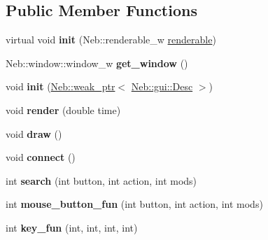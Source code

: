\subsection*{\-Public \-Member \-Functions}
\begin{DoxyCompactItemize}
\item 
\hypertarget{classNeb_1_1gui_1_1layout_a62b6d681dfea9f0dc35e6284f0daacd9}{virtual void {\bfseries init} (\-Neb\-::renderable\-\_\-w \hyperlink{classNeb_1_1renderable}{renderable})}\label{classNeb_1_1gui_1_1layout_a62b6d681dfea9f0dc35e6284f0daacd9}

\item 
\hypertarget{classNeb_1_1gui_1_1layout_a524c01b6af0320f6c89eec7b2d8a7409}{\-Neb\-::window\-::window\-\_\-w {\bfseries get\-\_\-window} ()}\label{classNeb_1_1gui_1_1layout_a524c01b6af0320f6c89eec7b2d8a7409}

\item 
\hypertarget{classNeb_1_1gui_1_1layout_af415dbb46b787503ce59ea2633a120d5}{void {\bfseries init} (\hyperlink{classNeb_1_1weak__ptr}{\-Neb\-::weak\-\_\-ptr}$<$ \hyperlink{classNeb_1_1gui_1_1Desc}{\-Neb\-::gui\-::\-Desc} $>$)}\label{classNeb_1_1gui_1_1layout_af415dbb46b787503ce59ea2633a120d5}

\item 
\hypertarget{classNeb_1_1gui_1_1layout_a74db00418c895eb927fb677d62840da2}{void {\bfseries render} (double time)}\label{classNeb_1_1gui_1_1layout_a74db00418c895eb927fb677d62840da2}

\item 
\hypertarget{classNeb_1_1gui_1_1layout_a9847407c316541a74dbfc9dc5bfbcca5}{void {\bfseries draw} ()}\label{classNeb_1_1gui_1_1layout_a9847407c316541a74dbfc9dc5bfbcca5}

\item 
\hypertarget{classNeb_1_1gui_1_1layout_af5c47df62d77066d3bb80e0387f1955a}{void {\bfseries connect} ()}\label{classNeb_1_1gui_1_1layout_af5c47df62d77066d3bb80e0387f1955a}

\item 
\hypertarget{classNeb_1_1gui_1_1layout_a73ec1453db20d46c72ccf0687499fce0}{int {\bfseries search} (int button, int action, int mods)}\label{classNeb_1_1gui_1_1layout_a73ec1453db20d46c72ccf0687499fce0}

\item 
\hypertarget{classNeb_1_1gui_1_1layout_aeb830e05ab8d72374c49c3d9df4470f8}{int {\bfseries mouse\-\_\-button\-\_\-fun} (int button, int action, int mods)}\label{classNeb_1_1gui_1_1layout_aeb830e05ab8d72374c49c3d9df4470f8}

\item 
\hypertarget{classNeb_1_1gui_1_1layout_a7cc59f1cda6205cb81cfa08aab5b9a6e}{int {\bfseries key\-\_\-fun} (int, int, int, int)}\label{classNeb_1_1gui_1_1layout_a7cc59f1cda6205cb81cfa08aab5b9a6e}

\end{DoxyCompactItemize}
